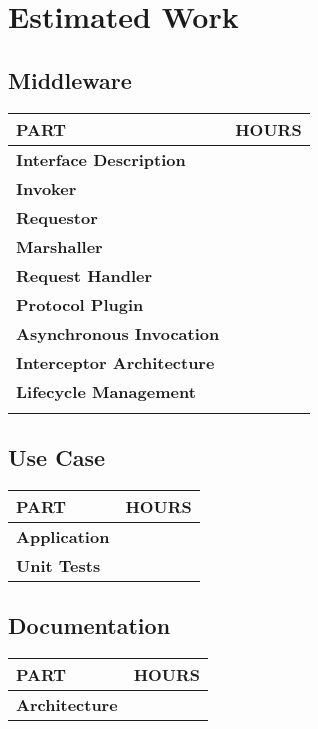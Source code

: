 \documentclass[a4paper]{article}
\begin{document}
\pagestyle{empty}
\section*{Estimated Work}
\vspace{0.5cm}
\subsection*{Middleware}

\begin{small}
\begin{tabular}{| p{4cm} | p{9cm} |}\hline
\textbf{PART} & \textbf{HOURS}\\\hline\hline
\textbf{Interface Description} & \\\hline
\textbf{Invoker} & \\\hline
\textbf{Requestor} & \\\hline
\textbf{Marshaller} & \\\hline
\textbf{Request Handler} & \\\hline
\textbf{Protocol Plugin} & \\\hline
\textbf{Asynchronous Invocation} & \\\hline
\textbf{Interceptor Architecture} & \\\hline
\textbf{Lifecycle Management} & \\\hline\hline
 & \\\hline
\end{tabular}
\end{small}

\vspace{1cm}

\subsection*{Use Case}

\begin{small}
\begin{tabular}{| p{4cm} | p{9cm} |}\hline
\textbf{PART} & \textbf{HOURS}\\\hline\hline
\textbf{Application} & \\\hline
\textbf{Unit Tests} & \\\hline
\end{tabular}
\end{small}


\vspace{1cm}

\subsection*{Documentation}

\begin{small}
\begin{tabular}{| p{4cm} | p{9cm} |}\hline
\textbf{PART} & \textbf{HOURS}\\\hline\hline
\textbf{Architecture} & \\\hline
\end{tabular}
\end{small}
\end{document}

